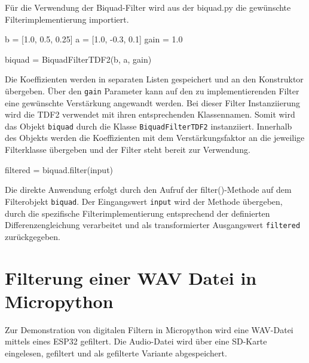 \documentclass[
  ngerman,
  letterpaper,
  DIV=11]{scrreprt}
\newenvironment{Shaded}{\begin{snugshade}}{\end{snugshade}}
\newcommand{\BuiltInTok}[1]{\textcolor[rgb]{0.00,0.23,0.31}{#1}}
\newcommand{\FloatTok}[1]{\textcolor[rgb]{0.68,0.00,0.00}{#1}}
\newcommand{\NormalTok}[1]{\textcolor[rgb]{0.00,0.23,0.31}{#1}}
\newcommand{\OperatorTok}[1]{\textcolor[rgb]{0.37,0.37,0.37}{#1}}
\begin{document}
Für die Verwendung der Biquad-Filter wird aus der biquad.py die
gewünschte Filterimplementierung importiert.

\begin{Shaded}
\begin{Highlighting}[]
\NormalTok{b }\OperatorTok{=}\NormalTok{ [}\FloatTok{1.0}\NormalTok{, }\FloatTok{0.5}\NormalTok{, }\FloatTok{0.25}\NormalTok{]}
\NormalTok{a }\OperatorTok{=}\NormalTok{ [}\FloatTok{1.0}\NormalTok{, }\OperatorTok{{-}}\FloatTok{0.3}\NormalTok{, }\FloatTok{0.1}\NormalTok{]}
\NormalTok{gain }\OperatorTok{=} \FloatTok{1.0}

\NormalTok{biquad }\OperatorTok{=}\NormalTok{ BiquadFilterTDF2(b, a, gain)}
\end{Highlighting}
\end{Shaded}

Die Koeffizienten werden in separaten Listen gespeichert und an den
Konstruktor übergeben. Über den \texttt{gain} Parameter kann auf den zu
implementierenden Filter eine gewünschte Verstärkung angewandt werden.
Bei dieser Filter Instanziierung wird die TDF2 verwendet mit ihren
entsprechenden Klassennamen. Somit wird das Objekt \texttt{biquad} durch
die Klasse \texttt{BiquadFilterTDF2} instanziiert. Innerhalb des Objekts
werden die Koeffizienten mit dem Verstärkungsfaktor an die jeweilige
Filterklasse übergeben und der Filter steht bereit zur Verwendung.

\begin{Shaded}
\begin{Highlighting}[]
\NormalTok{filtered }\OperatorTok{=}\NormalTok{ biquad.}\BuiltInTok{filter}\NormalTok{(}\BuiltInTok{input}\NormalTok{)}
\end{Highlighting}
\end{Shaded}

Die direkte Anwendung erfolgt durch den Aufruf der filter()-Methode auf
dem Filterobjekt \texttt{biquad}. Der Eingangswert \texttt{input} wird
der Methode übergeben, durch die spezifische Filterimplementierung
entsprechend der definierten Differenzengleichung verarbeitet und als
transformierter Ausgangswert \texttt{filtered} zurückgegeben.

\chapter{Filterung einer WAV Datei in
Micropython}\label{filterung-einer-wav-datei-in-micropython}

Zur Demonstration von digitalen Filtern in Micropython wird eine
WAV-Datei mittels eines ESP32 gefiltert. Die Audio-Datei wird über eine
SD-Karte eingelesen, gefiltert und als gefilterte Variante
abgespeichert.
\end{document}
